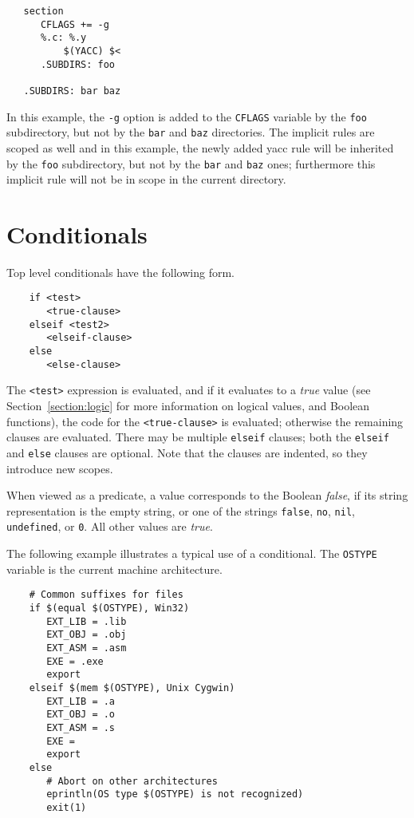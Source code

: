 \begin{verbatim}
   section
      CFLAGS += -g
      %.c: %.y
          $(YACC) $<
      .SUBDIRS: foo

   .SUBDIRS: bar baz
\end{verbatim}

In this example, the \verb+-g+ option is added to the \verb+CFLAGS+
variable by the \verb+foo+ subdirectory, but not by the \verb+bar+ and
\verb+baz+ directories. The implicit rules are scoped as well and in this
example, the newly added yacc rule will be inherited by the \verb+foo+
subdirectory, but not by the \verb+bar+ and \verb+baz+ ones; furthermore
this implicit rule will not be in scope in the current directory.

\section{Conditionals}
\label{section:conditionals}

Top level conditionals have the following form.

\begin{verbatim}
    if <test>
       <true-clause>
    elseif <test2>
       <elseif-clause>
    else
       <else-clause>
\end{verbatim}

The \verb+<test>+ expression is evaluated, and if it evaluates to a \emph{true} value (see
Section~\ref{section:logic} for more information on logical values, and Boolean functions), the code
for the \verb+<true-clause>+ is evaluated; otherwise the remaining clauses are evaluated.  There may
be multiple \verb+elseif+ clauses; both the \verb+elseif+ and \verb+else+ clauses are optional.
Note that the clauses are indented, so they introduce new scopes.

When viewed as a predicate, a value corresponds to the Boolean \emph{false}, if its string
representation is the empty string, or one of the strings \verb+false+, \verb+no+, \verb+nil+,
\verb+undefined+, or \verb+0+.  All other values are \emph{true}.

The following example illustrates a typical use of a conditional.  The
\verb+OSTYPE+ variable is the current machine architecture.

\begin{verbatim}
    # Common suffixes for files
    if $(equal $(OSTYPE), Win32)
       EXT_LIB = .lib
       EXT_OBJ = .obj
       EXT_ASM = .asm
       EXE = .exe
       export
    elseif $(mem $(OSTYPE), Unix Cygwin)
       EXT_LIB = .a
       EXT_OBJ = .o
       EXT_ASM = .s
       EXE =
       export
    else
       # Abort on other architectures
       eprintln(OS type $(OSTYPE) is not recognized)
       exit(1)
\end{verbatim}

